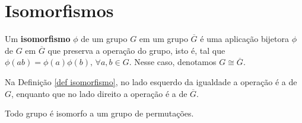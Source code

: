 
\section{Isomorfismos}
    \begin{definition}[Isomorfismo]
	\label{def isomorfismo}
		Um \textbf{isomorfismo} $\phi$ de um grupo $G$ em um grupo
		$\overline{G}$ é uma aplicação bijetora $\phi$ de $G$ em
		$\overline{G}$ que preserva a operação do grupo, isto é, 
		tal que $\phi(ab) = \phi(a)\phi(b), \, \forall a,b\in G$.
		Nesse caso, denotamos $G\cong\overline{G}$.
	\end{definition}
	Na Definição \ref{def isomorfismo}, no lado
	esquerdo da igualdade a operação é a de $G$, enquanto que no lado
	direito a operação é a de $\overline{G}$.
	\begin{theorem}
	\label{Cayley}
		Todo grupo é isomorfo a um grupo de permutações.
	\end{theorem}
